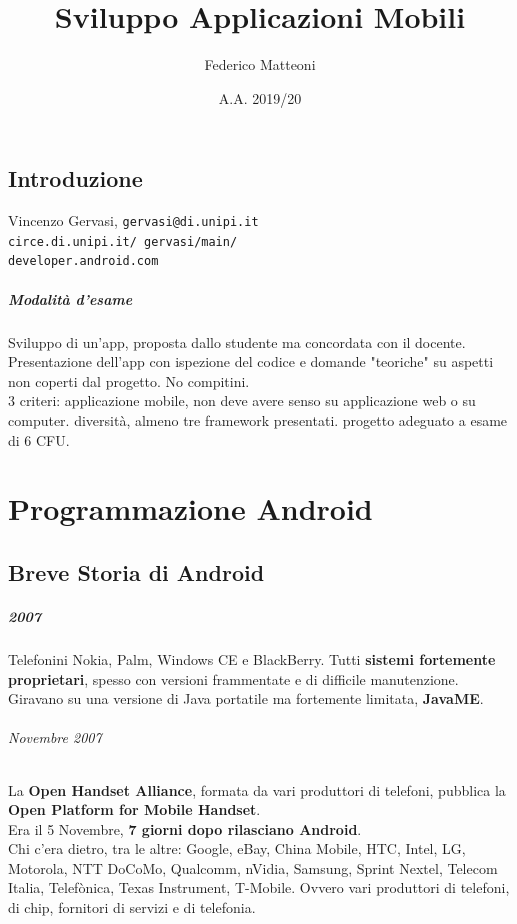 \documentclass[10pt]{book}
\begin{document}
\renewcommand*\contentsname{Indice}
\title{Sviluppo Applicazioni Mobili}
\author{Federico Matteoni}
\date{A.A. 2019/20}
\maketitle
\tableofcontents
\pagebreak
\section*{Introduzione}
Vincenzo Gervasi, \texttt{gervasi@di.unipi.it}\\
\texttt{circe.di.unipi.it/~gervasi/main/}\\
\texttt{developer.android.com}

\paragraph{Modalità d'esame} Sviluppo di un'app, proposta dallo studente ma concordata con il docente. Presentazione dell'app con ispezione del codice e domande "teoriche" su aspetti non coperti dal progetto. No compitini.\\
3 criteri: applicazione mobile, non deve avere senso su applicazione web o su computer. diversità, almeno tre framework presentati. progetto adeguato a esame di 6 CFU.

\chapter{Programmazione Android}
\section{Breve Storia di Android}
\paragraph{2007} Telefonini Nokia, Palm, Windows CE e BlackBerry. Tutti \textbf{sistemi fortemente proprietari}, spesso con versioni frammentate e di difficile manutenzione. Giravano su una versione di Java portatile ma fortemente limitata, \textbf{JavaME}.
\subparagraph{Novembre 2007}  La \textbf{Open Handset Alliance}, formata da vari produttori di telefoni, pubblica la \textbf{Open Platform for Mobile Handset}.\\
Era il 5 Novembre, \textbf{7 giorni dopo rilasciano Android}.\\
Chi c'era dietro, tra le altre: Google, eBay, China Mobile, HTC, Intel, LG, Motorola, NTT DoCoMo, Qualcomm, nVidia, Samsung, Sprint Nextel, Telecom Italia, Telefònica, Texas Instrument, T-Mobile. Ovvero vari produttori di telefoni, di chip, fornitori di servizi e di telefonia.
\end{document}
